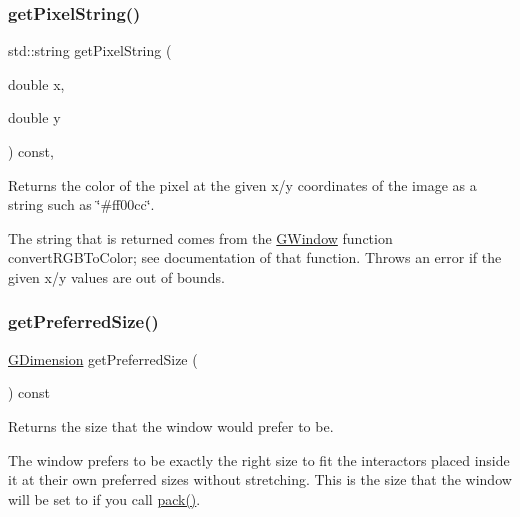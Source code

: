 \subsubsection{\texorpdfstring{get\+Pixel\+String()}{getPixelString()}}
{\footnotesize\ttfamily std\+::string get\+Pixel\+String (\begin{DoxyParamCaption}\item[{double}]{x,  }\item[{double}]{y }\end{DoxyParamCaption}) const\hspace{0.3cm}{\ttfamily [virtual]}, {\ttfamily [inherited]}}



Returns the color of the pixel at the given x/y coordinates of the image as a string such as \char`\"{}\#ff00cc\char`\"{}. 

The string that is returned comes from the {\ttfamily \mbox{\hyperlink{classsgl_1_1GWindow}{G\+Window}}} function {\ttfamily convert\+R\+G\+B\+To\+Color}; see documentation of that function. Throws an error if the given x/y values are out of bounds. \mbox{\label{classsgl_1_1GWindow_a4aabbee761d8e9116275401131b7ccd1}} 
\subsubsection{\texorpdfstring{get\+Preferred\+Size()}{getPreferredSize()}}
{\footnotesize\ttfamily \mbox{\hyperlink{structsgl_1_1GDimension}{G\+Dimension}} get\+Preferred\+Size (\begin{DoxyParamCaption}{ }\end{DoxyParamCaption}) const\hspace{0.3cm}{\ttfamily [virtual]}}



Returns the size that the window would prefer to be. 

The window prefers to be exactly the right size to fit the interactors placed inside it at their own preferred sizes without stretching. This is the size that the window will be set to if you call \mbox{\hyperlink{classsgl_1_1GWindow_a915ffc82b17862ab1d2a466a79d23a3f}{pack()}}. \mbox{\label{classsgl_1_1GWindow_a164d248057318961e7f2abc8c3477d63}} 
